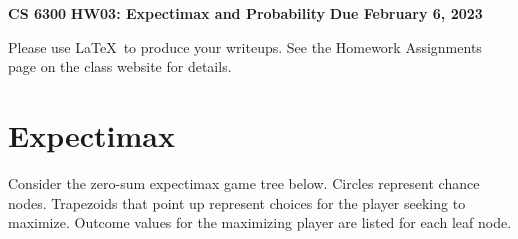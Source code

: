 \documentclass[12pt]{article}
\begin{document}
\begin{center}
  {\bf CS 6300} \hfill {\large\bf HW03: Expectimax and Probability} \hfill {\bf Due February 6, 2023}
\end{center}

Please use \LaTeX\ to produce your writeups. See the Homework
Assignments page on the class website for details.

\section{Expectimax}

Consider the zero-sum expectimax game tree below.  Circles represent
chance nodes.  Trapezoids that point up represent choices for the
player seeking to maximize. Outcome values for the maximizing player
are listed for each leaf node.
\end{document}
